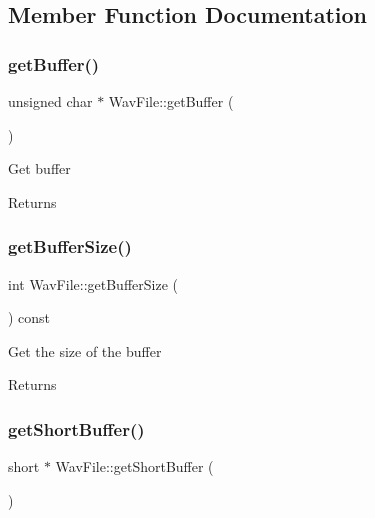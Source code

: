 \subsection{Member Function Documentation}
\mbox{\label{classWavFile_afaf8f58b0c3732079644a366b39f5c28}} 
\subsubsection{\texorpdfstring{get\+Buffer()}{getBuffer()}}
{\footnotesize\ttfamily unsigned char $\ast$ Wav\+File\+::get\+Buffer (\begin{DoxyParamCaption}{ }\end{DoxyParamCaption})}

Get buffer \begin{DoxyReturn}{Returns}

\end{DoxyReturn}
\mbox{\label{classWavFile_aced9840645cf59cffc1c96f0d44575fe}} 
\subsubsection{\texorpdfstring{get\+Buffer\+Size()}{getBufferSize()}}
{\footnotesize\ttfamily int Wav\+File\+::get\+Buffer\+Size (\begin{DoxyParamCaption}{ }\end{DoxyParamCaption}) const}

Get the size of the buffer \begin{DoxyReturn}{Returns}

\end{DoxyReturn}
\mbox{\label{classWavFile_ad8f9daefb75a9467c499eb27b4e3ec73}} 
\subsubsection{\texorpdfstring{get\+Short\+Buffer()}{getShortBuffer()}}
{\footnotesize\ttfamily short $\ast$ Wav\+File\+::get\+Short\+Buffer (\begin{DoxyParamCaption}{ }\end{DoxyParamCaption})}

